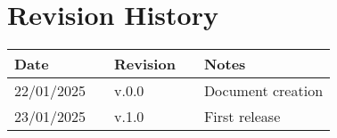 \chapter*{Revision History}

\begin{table}[h]
    \centering
    \begin{tabular}{l p{.5cm} l p{1cm} l}
        \hline
        \textbf{Date} &  & \textbf{Revision} &  & \textbf{Notes}    \\ \hline
        22/01/2025    &  & v.0.0             &  & Document creation \\
        23/01/2025    &  & v.1.0             &  & First release     \\\hline
    \end{tabular}
\end{table}

\newpage